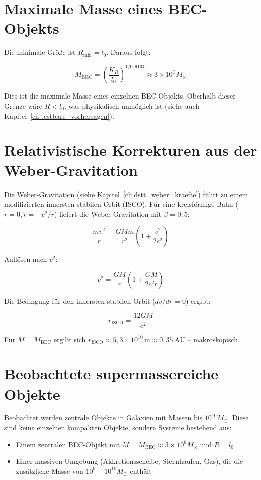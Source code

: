 \section{Maximale Masse eines BEC-Objekts}
\label{sec:bec_max_masse}

Die minimale Größe ist \( R_{\text{min}} = l_0 \). Daraus folgt:

\[
M_{\text{BEC}} = \left( \frac{K_R}{l_0} \right)^{1/0,9134} \approx 3 \times 10^6 M_\odot
\]

Dies ist die maximale Masse eines einzelnen BEC-Objekts. Oberhalb dieser Grenze wäre \( R < l_0 \), was physikalisch unmöglich ist (siehe auch Kapitel~\ref{ch:testbare_vorhersagen}).

\section{Relativistische Korrekturen aus der Weber-Gravitation}
\label{sec:bec_relativistik}

Die Weber-Gravitation (siehe Kapitel~\ref{ch:dstt_weber_kraefte}) führt zu einem modifizierten innersten stabilen Orbit (ISCO). Für eine kreisförmige Bahn (\( \dot{r} = 0, \ddot{r} = -v^2/r \)) liefert die Weber-Gravitation mit \( \beta = 0,5 \):

\[
\frac{mv^2}{r} = \frac{GMm}{r^2} \left( 1 + \frac{v^2}{2c^2} \right)
\]

Auflösen nach \( v^2 \):

\[
v^2 = \frac{GM}{r} \left( 1 + \frac{GM}{2c^2 r} \right)
\]

Die Bedingung für den innersten stabilen Orbit (\( dv/dr = 0 \)) ergibt:

\[
r_{\text{ISCO}} = \frac{12GM}{c^2}
\]

Für \( M = M_{\text{BEC}} \) ergibt sich \( r_{\text{ISCO}} \approx 5,3 \times 10^{10} \, \text{m} \approx 0,35 \, \text{AU} \) – makroskopisch.

\section{Beobachtete supermassereiche Objekte}
\label{sec:bec_beobachtung}

Beobachtet werden zentrale Objekte in Galaxien mit Massen bis \( 10^{10} M_\odot \). Diese sind keine einzelnen kompakten Objekte, sondern Systeme bestehend aus:

\begin{itemize}
    \item Einem zentralen BEC-Objekt mit \( M = M_{\text{BEC}} \approx 3 \times 10^6 M_\odot \) und \( R = l_0 \)
    \item Einer massiven Umgebung (Akkretionsscheibe, Sternhaufen, Gas), die die zusätzliche Masse von \( 10^9 - 10^{10} M_\odot \) enthält
\end{itemize}


